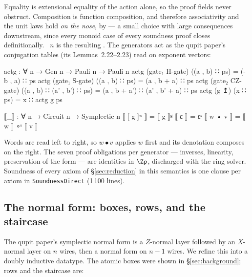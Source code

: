 Equality is extensional equality of the action alone, so the proof
fields never obstruct.  Composition is function composition, and
therefore associativity and the unit laws hold \emph{on the nose}, by
 --- a small choice with large consequences downstream, since
every monoid case of every soundness proof closes definitionally.
~$n$ is the resulting .  The generators act
as the qupit paper's conjugation tables (its Lemmas~2.22--2.23) read on
exponent vectors:

\begin{agdacode}
actg : ∀ {n} → Gen n → Pauli n → Pauli n
actg (gate₁ H-gate)  ((a , b) ∷ ps)             = (- b , a) ∷ ps
actg (gate₁ S-gate)  ((a , b) ∷ ps)             = (a , b + a) ∷ ps
actg (gate₂ CZ-gate) ((a , b) ∷ (a' , b') ∷ ps) = (a , b + a') ∷ (a' , b' + a) ∷ ps
actg (g ↥)           (x ∷ ps)                   = x ∷ actg g ps

⟦_⟧ : ∀ {n} → Circuit n → Symplectic n
⟦ [ g ]ʷ ⟧ = ⟦ g ⟧ᵍ
⟦ ε ⟧      = εˢ
⟦ w • v ⟧  = ⟦ w ⟧ ∘ˢ ⟦ v ⟧
\end{agdacode}

Words are read left to right, so $w \bullet v$ applies $w$ first and its
denotation composes on the right.  The seven proof obligations per
generator --- inverses, linearity, preservation of the form --- are
identities in $\Zp$, discharged with the ring solver.  Soundness of
every axiom of \S\ref{sec:reduction} in this semantics is one clause per
axiom in \texttt{SoundnessDirect} (1\,100 lines).

\subsection{The normal form: boxes, rows, and the staircase}\label{sec:nf}

The qupit paper's symplectic normal form is a $Z$-normal layer followed
by an $X$-normal layer on $n$ wires, then a normal form on $n-1$ wires.
We refine this into a doubly inductive datatype.  The atomic boxes were
shown in \S\ref{sec:background}; rows and the staircase are:

